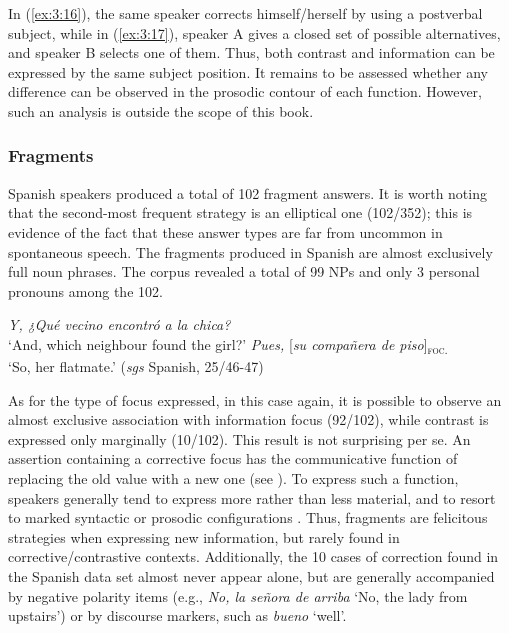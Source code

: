 {In (\ref{ex:3:16}), the same speaker corrects himself/herself by using a postverbal subject, while in (\ref{ex:3:17}), speaker A gives a closed set of possible alternatives, and speaker B selects one of them. Thus, both contrast and information can be expressed by the same subject position. It remains to be assessed whether any difference can be observed in the prosodic contour of each function. However, such an analysis is outside the scope of this book.


\subsubsection{Fragments} \label{sub:4.5.1.3}

Spanish speakers produced a total of 102 fragment answers. It is worth noting that the second-most frequent strategy is an elliptical one (102/352); this is evidence of the fact that these answer types are far from uncommon in spontaneous speech.
The fragments produced in Spanish are almost exclusively full noun phrases. The corpus revealed a total of 99 NPs and only 3 personal pronouns among the 102.

 \ea \label{ex:3:18}
\ea \textit{Y, ¿Qué vecino encontró a la chica? }\\
 ‘And, which neighbour found the girl?'
\ex \textit{Pues,} {[\textit{su compañera de piso}]\textsubscript{\textsc{foc.}}}\normalsize\\
‘So, her flatmate.' \hfill (\textit{sgs} Spanish, 25/46-47)   
\z \z 


As for the type of focus expressed, in this case again, it is possible to observe an almost exclusive association with information focus (92/102), while contrast is expressed only marginally (10/102). This result is not surprising per se. An assertion containing a corrective focus has the communicative function of replacing the old value with a new one (see \cite{gussenhoven2008types}). To express such a function, speakers generally tend to express more rather than less material, and to resort to marked syntactic or prosodic configurations \parencite{zimmermann2008contrastive}. Thus, fragments are felicitous strategies when expressing new information, but rarely found in corrective/contrastive contexts. Additionally, the 10 cases of correction found in the Spanish data set almost never appear alone, but are generally accompanied by negative polarity items (e.g., \textit{No, la señora de arriba} `No, the lady from upstairs') or by discourse markers, such as \textit{bueno} `well'.


}
